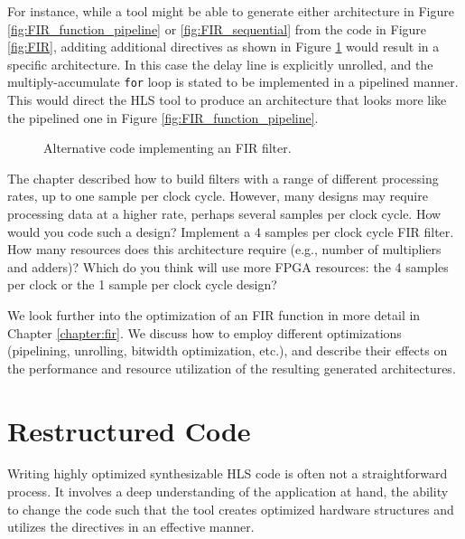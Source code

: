 For instance, while a tool might be able to generate either architecture in Figure \ref{fig:FIR_function_pipeline} or \ref{fig:FIR_sequential} from the code in Figure \ref{fig:FIR}, additing additional directives as shown in Figure \ref{fig:block_FIR} would result in a specific architecture. In this case the delay line is explicitly unrolled, and the multiply-accumulate \lstinline|for| loop is stated to be implemented in a pipelined manner. This would direct the HLS tool to produce an architecture that looks more like the pipelined one in Figure \ref{fig:FIR_function_pipeline}.

\begin{figure}
\begin{scriptsize}

\end{scriptsize}
\caption{Alternative code implementing an FIR filter.}\label{fig:block_FIR}
\end{figure}




\begin{exercise}
The chapter described how to build filters with a range of different processing rates, up to one sample per clock cycle.  However, many designs may require processing data at a higher rate, perhaps several samples per clock cycle.  How would you code such a design?  Implement a 4 samples per clock cycle FIR filter.  How many resources does this architecture require (e.g., number of multipliers and adders)? Which do you think will use more FPGA resources: the 4 samples per clock or the 1 sample per clock cycle design?  
\end{exercise}

We look further into the optimization of an FIR function in more detail in Chapter \ref{chapter:fir}. We discuss how to employ different optimizations (pipelining, unrolling, bitwidth optimization, etc.), and describe their effects on the performance and resource utilization of the resulting generated architectures.

\section{Restructured Code}

Writing highly optimized synthesizable HLS code is often not a straightforward process. It involves a deep understanding of the application at hand, the ability to change the code such that the \VHLS tool creates optimized hardware structures and utilizes the directives in an effective manner. 

